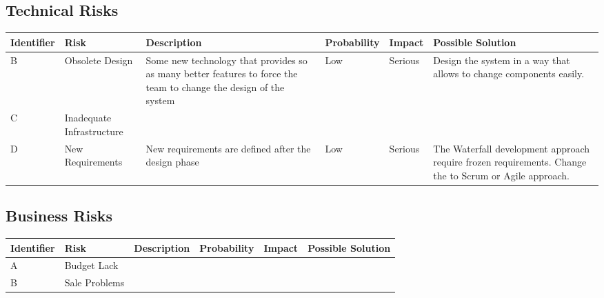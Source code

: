 \subsection{Technical Risks}

\begin{adjustbox}{max width=\textwidth}
\begin{tabular}{|l|l|p{5 cm}|l|l|p{5cm}|}
\hline
Identifier & Risk & Description & Probability & Impact & Possible Solution
\\ \hline
B & Obsolete Design & Some new technology that provides so as many better features to force the team to change the design of the system  & Low & Serious & Design the system in a way that allows to change components easily.
\\ \hline
C & Inadequate Infrastructure & & & &
\\ \hline
D & New Requirements & New requirements are defined after the design phase& Low & Serious &The Waterfall development approach require frozen requirements. Change the to Scrum or Agile approach.

\\ \hline
\end{tabular}
\end{adjustbox}
\subsection{Business Risks}

\begin{adjustbox}{max width=\textwidth}
\begin{tabular}{|l|l|l|l|l|l|}
\hline
Identifier & Risk & Description & Probability & Impact & Possible Solution
\\ \hline
A & Budget Lack & & & &
\\ \hline
B & Sale Problems & & & &
\\ \hline
\end{tabular}
\end{adjustbox}